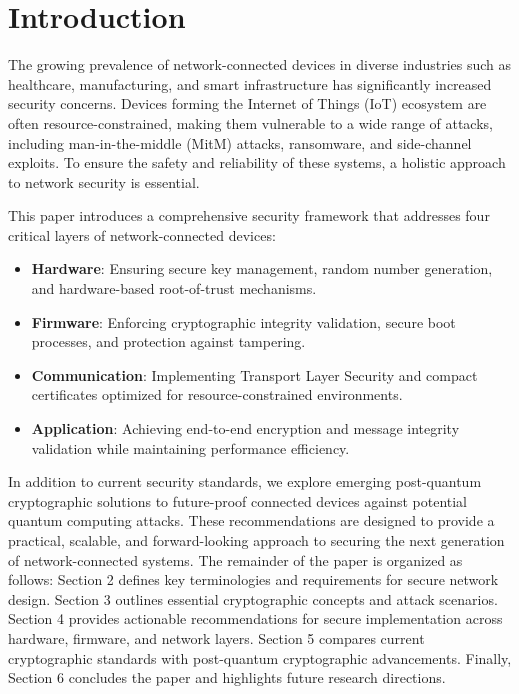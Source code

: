 \documentclass[pdflatex,sn-mathphys-num]{sn-jnl}%
\theoremstyle{thmstyleone}%
\theoremstyle{thmstyletwo}%
\theoremstyle{thmstylethree}%
\begin{document}



\maketitle

\section{Introduction}
The growing prevalence of network-connected devices in diverse industries such as healthcare, manufacturing, and smart infrastructure has significantly increased security concerns. Devices forming the Internet of Things (IoT) ecosystem are often resource-constrained, making them vulnerable to a wide range of attacks, including man-in-the-middle (MitM) attacks, ransomware, and side-channel exploits. To ensure the safety and reliability of these systems, a holistic approach to network security is essential.

This paper introduces a comprehensive security framework that addresses four critical layers of network-connected devices:

\begin{itemize}
    \item[] \textbf{Hardware}: Ensuring secure key management, random number generation, and hardware-based root-of-trust mechanisms.

    \item[] \textbf{Firmware}: Enforcing cryptographic integrity validation, secure boot processes, and protection against tampering.

    \item[] \textbf{Communication}: Implementing Transport Layer Security  and compact certificates optimized for resource-constrained environments.

    \item[] \textbf{Application}: Achieving end-to-end encryption and message integrity validation while maintaining performance efficiency.
\end{itemize}


In addition to current security standards, we explore emerging post-quantum cryptographic solutions to future-proof connected devices against potential quantum computing attacks. These recommendations are designed to provide a practical, scalable, and forward-looking approach to securing the next generation of network-connected systems.
The remainder of the paper is organized as follows: Section 2 defines key terminologies and requirements for secure network design.  Section 3 outlines essential cryptographic concepts and attack scenarios. Section 4 provides actionable recommendations for secure implementation across hardware, firmware, and network layers. Section 5 compares current cryptographic standards with post-quantum cryptographic advancements. Finally, Section 6 concludes the paper and highlights future research directions.
\end{document}
